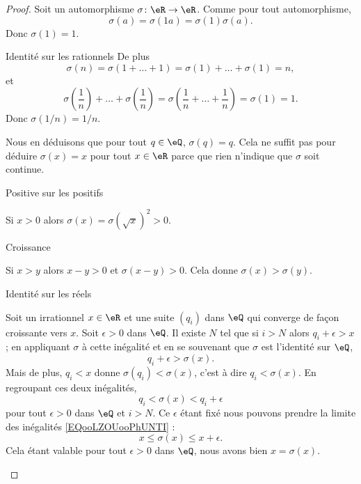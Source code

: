 \begin{proof}
    Soit un automorphisme \( \sigma\colon \eR\to \eR\). Comme pour tout automorphisme, 
    \begin{equation}
        \sigma(a)=\sigma(1a)=\sigma(1)\sigma(a).
    \end{equation}
    Donc \( \sigma(1)=1\).

    \begin{subproof}
    \item[Identité sur les rationnels]
    De plus 
    \begin{equation}
        \sigma(n)=\sigma(1+\ldots +1)=\sigma(1)+\ldots +\sigma(1)=n,
    \end{equation}
    et
    \begin{equation}
        \sigma\left( \frac{1}{ n } \right)+\ldots +\sigma\left( \frac{1}{ n } \right)=\sigma\left( \frac{1}{ n }+\ldots +\frac{1}{ n } \right)=\sigma(1)=1.
    \end{equation}
    Donc \( \sigma(1/n)=1/n\).

    Nous en déduisons que pour tout \( q\in \eQ\), \( \sigma(q)=q\). Cela ne suffit pas pour déduire \( \sigma(x)=x\) pour tout \( x\in \eR\) parce que rien n'indique que \( \sigma\) soit continue.
        \item[Positive sur les positifs]

            Si \( x>0\) alors \( \sigma(x)=\sigma(\sqrt{ x })^2>0\).

        \item[Croissance]

            Si \( x>y\) alors \( x-y>0\) et \( \sigma(x-y)>0\). Cela donne \( \sigma(x)>\sigma(y)\).

        \item[Identité sur les réels]

            Soit un irrationnel \( x\in \eR\) et une suite \( (q_i)\) dans \( \eQ\) qui converge de façon croissante vers \( x\). Soit \( \epsilon>0\) dans \( \eQ\). Il existe \( N\) tel que si \( i>N\) alors \( q_i+\epsilon>x\); en appliquant \( \sigma\) à cette inégalité et en se souvenant que \( \sigma\) est l'identité sur \( \eQ\),
            \begin{equation}
                q_i+\epsilon>\sigma(x).
            \end{equation}
            Mais de plus, \( q_i<x\) donne \( \sigma(q_i)<\sigma(x)\), c'est à dire \( q_i<\sigma(x)\). En regroupant ces deux inégalités,
            \begin{equation}        \label{EQooLZOUooPhUNTI}
                q_i<\sigma(x)<q_i+\epsilon
            \end{equation}
            pour tout \( \epsilon>0\) dans \( \eQ\) et \( i>N\). Ce \( \epsilon\) étant fixé nous pouvons prendre la limite des inégalités \eqref{EQooLZOUooPhUNTI} :
            \begin{equation}
                x\leq \sigma(x)\leq x+\epsilon.
            \end{equation}
            Cela étant valable pour tout \( \epsilon>0\) dans \( \eQ\), nous avons bien \( x=\sigma(x)\).
    \end{subproof}
\end{proof}

